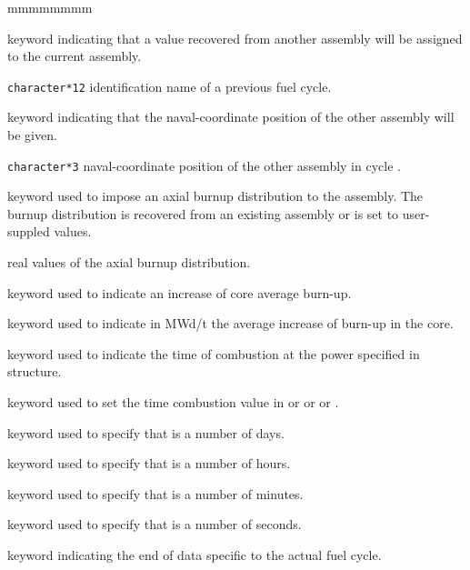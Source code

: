 \begin{ListeDeDescription}{mmmmmmmm}
\item[\moc{FROM}] keyword indicating that a value recovered from another assembly will be assigned to the current assembly.

\item[\dusa{hcold2}] \texttt{character*12} identification name of a previous fuel cycle.

\item[\moc{AT}] keyword indicating that the naval-coordinate position of the other assembly will be given.

\item[\dusa{asmb2}] \texttt{character*3} naval-coordinate position of the other assembly in cycle .

\item[\moc{DIST-AX}] keyword used to impose an axial burnup distribution to the assembly. The burnup distribution is recovered from an existing assembly or is set to
user-suppled values.

\item[\dusa{axn}] real values of the axial burnup distribution.

\item[\moc{BURN-STEP}] keyword used to indicate an increase of core average burn-up.

\item[\dusa{rburn}] keyword used to indicate in MWd/t the average increase
of burn-up in the core.

\item[\moc{TIME}] keyword used to indicate the time of combustion at the power specified
in  structure.

\item[\dusa{rtime}] keyword used to set the time combustion value in  or 
or  or .

\item[\moc{DAY}] keyword used to specify that  is a number of days.

\item[\moc{HOUR}] keyword used to specify that  is a number of hours.

\item[\moc{MINUTE}] keyword used to specify that  is a number of minutes.

\item[\moc{SECOND}] keyword used to specify that  is a number of seconds.

\item[\moc{ENDCYCLE}] keyword indicating the end of data specific to the actual fuel cycle.


\end{ListeDeDescription}

